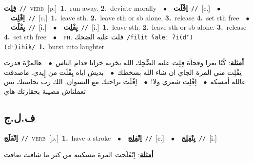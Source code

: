 \documentclass[10pt,a4paper,twoside]{article} %
\begin{document}
\begin{multicols}{2}
{\setlength\topsep{0pt}\textbf{\foreignlanguage{arabic}{فِلِت}}\ {\color{gray}\texttt{//}\color{black}}\ \textsc{verb}\ [p.]\ \textbf{1.}~run away.  \textbf{2.}~deviate morally\ \ $\bullet$\ \ \setlength\topsep{0pt}\textbf{\foreignlanguage{arabic}{اِفْلَت}}\ {\color{gray}\texttt{//}\color{black}}\ [c.]\ \ $\bullet$\ \ \setlength\topsep{0pt}\textbf{\foreignlanguage{arabic}{اِفْلِت}}\ {\color{gray}\texttt{//}\color{black}}\ [c.]\ \textbf{1.}~leave sth.  \textbf{2.}~leave sth or sb alone.  \textbf{3.}~release  \textbf{4.}~set sth free\ \ $\bullet$\ \ \setlength\topsep{0pt}\textbf{\foreignlanguage{arabic}{يِفْلَت}}\ {\color{gray}\texttt{//}\color{black}}\ [i.]\ \ $\bullet$\ \ \setlength\topsep{0pt}\textbf{\foreignlanguage{arabic}{يِفْلِت}}\ {\color{gray}\texttt{//}\color{black}}\ [i.]\ \textbf{1.}~leave sth.  \textbf{2.}~leave sth or sb alone.  \textbf{3.}~release  \textbf{4.}~set sth free\ \ $\bullet$\ \ \textsc{ph.} \color{gray} \foreignlanguage{arabic}{فلت عليه الضحك}\color{black}\ {\color{gray}\texttt{/{\sffamily filit ʕaleː ʔi(dˤ)(dˤ)iħik}/}\color{black}}\ \textbf{1.}~burst into laughter\  \begin{flushright}\color{gray}\foreignlanguage{arabic}{\textbf{\underline{\foreignlanguage{arabic}{أمثلة}}}: كُنّا بعزا وفجأة فِلِت عليه الضِّحِك الله يخزيه خزانا قدام الناس\ $\bullet$\ \  هالمرَّة قدرت تِفْلِت مني المرة الجاي ان شاء الله بسخطك\ $\bullet$\ \  بديش اياه يِفْلَت من إِيدي. ماصدقت عالله أمسكه\ $\bullet$\ \  اِفْلِت شعري ولا!\ $\bullet$\ \  اِفْلَت براحتك مع النسوان. الك رب بحاسبك بس تعملناش مصيبة بحقارتك هاي}\end{flushright}\color{black}} \vspace{2mm}

\vspace{-3mm}
\subsection*{\color{blue}\foreignlanguage{arabic}{ف.ل.ج}\color{blue}{}} 

{\setlength\topsep{0pt}\textbf{\foreignlanguage{arabic}{اِنْفَلَج}}\ {\color{gray}\texttt{//}\color{black}}\ \textsc{verb}\ [p.]\ \textbf{1.}~have a stroke\ \ $\bullet$\ \ \setlength\topsep{0pt}\textbf{\foreignlanguage{arabic}{اِنْفِلِج}}\ {\color{gray}\texttt{//}\color{black}}\ [c.]\ \ $\bullet$\ \ \setlength\topsep{0pt}\textbf{\foreignlanguage{arabic}{يِنْفِلِج}}\ {\color{gray}\texttt{//}\color{black}}\ [i.]\  \begin{flushright}\color{gray}\foreignlanguage{arabic}{\textbf{\underline{\foreignlanguage{arabic}{أمثلة}}}: اِنْفَلَجت المرة مسكينة من كثر ما شافت تعافت}\end{flushright}\color{black}} \vspace{2mm}


\end{multicols}
\end{document}
